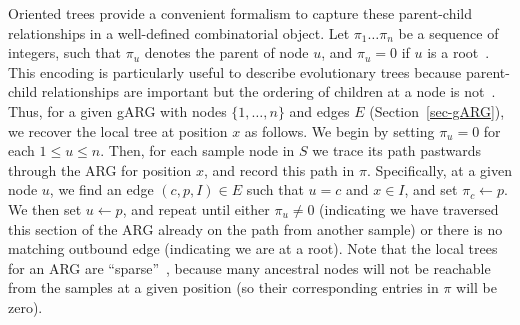\documentclass[9pt,twocolumn,twoside]{gsajnl}
\begin{document}
Oriented trees provide a
convenient formalism to capture these parent-child relationships
in a well-defined combinatorial object.
Let $\pi_1\dots\pi_n$ be a sequence of integers, such that $\pi_u$
denotes the parent of node $u$, and $\pi_u = 0$ if $u$ is a
root~\cite[p.\ 461]{knuth11combinatorial}.
This encoding is particularly useful to describe
evolutionary trees because parent-child relationships are
important but the ordering of children at a node is
not~\citep{kelleher2013coalescent,kelleher2014coalescent,
kelleher2016efficient}.
Thus, for a given gARG with nodes $\{1, \dots, n\}$ and
edges $E$ (Section~\ref{sec-gARG}), we recover the local tree
at position $x$ as follows.
We begin by setting $\pi_u = 0$ for each $1 \leq u \leq n$.
Then, for each sample node in $S$ we trace its path pastwards through the
ARG for position $x$, and record this path in $\pi$.
Specifically, at a given node $u$,
we find an edge $(c, p, I) \in E$ such that $u = c$ and $x \in I$, and set
$\pi_c \leftarrow p$. We then set $u \leftarrow p$, and repeat
until either $\pi_u \neq 0$ (indicating we have traversed this section
of the ARG already on the path from another sample) or there
is no matching outbound edge (indicating we are at a root).
Note that the local trees for an ARG are ``sparse''~\citep{kelleher2016efficient},
because many ancestral nodes will not be reachable from the
samples at a given position (so their corresponding entries in $\pi$ will be zero).
\end{document}
